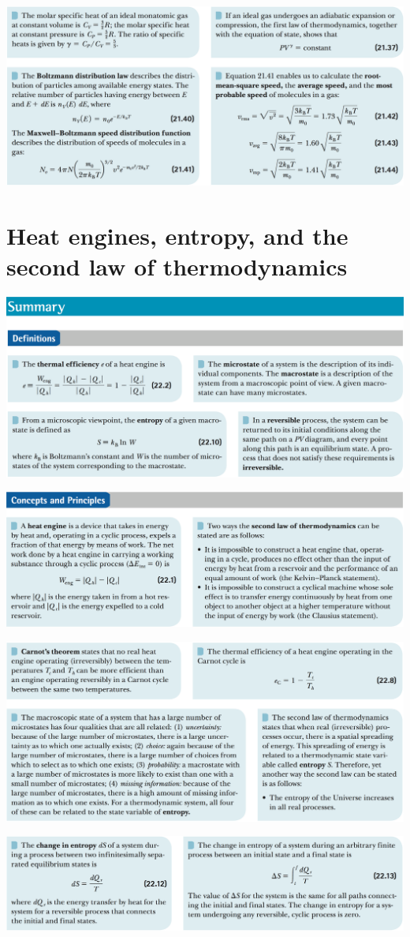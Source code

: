 \documentclass[12pt,a4paper]{article}
\newcommand{\N}{\noindent}
\begin{document}
		\vspace{2mm}
		\N \includegraphics[scale=.42]{3_b.png}
		
	\section{Heat engines, entropy, and the second law of thermodynamics}
		\N \includegraphics[scale=.42]{4_a.png}
		
		\vspace{2mm}
		\N \includegraphics[scale=.42]{4_b.png}
		
		\vspace{2mm}
		\N \includegraphics[scale=.42]{4_c.png}
		
		\vspace{2mm}
		\N \includegraphics[scale=.42]{4_d.png}
	
\end{document}
